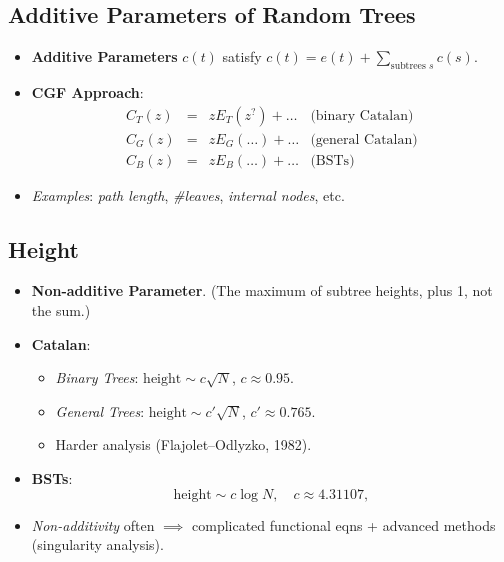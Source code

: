 \documentclass[11pt,letterpaper]{article}
\begin{document}
\subsection{Additive Parameters of Random Trees}
\begin{itemize}
  \item \textbf{Additive Parameters} $c(t)$ satisfy $c(t) = e(t) + \sum_{\text{subtrees }s}c(s)$.
  \item \textbf{CGF Approach}:
    \[
      \begin{aligned}
        C_T(z) &=& zE_T(z^?)+\dots & \text{(binary Catalan)}\\
        C_G(z) &=& zE_G(\dots)+\dots & \text{(general Catalan)}\\
        C_B(z) &=& zE_B(\dots)+\dots & \text{(BSTs)}
      \end{aligned}
    \]
  \item \emph{Examples}: \emph{path length}, \emph{\#leaves}, \emph{internal nodes}, etc.
\end{itemize}

\subsection{Height}
\begin{itemize}
  \item \textbf{Non-additive Parameter}. (The maximum of subtree heights, plus 1, not the sum.)
  \item \textbf{Catalan}:
    \begin{itemize}
      \item \textit{Binary Trees}: $\mathrm{height}\sim c\sqrt{N}$, $c\approx 0.95$. 
      \item \textit{General Trees}: $\mathrm{height}\sim c'\sqrt{N}$, $c'\approx 0.765$. 
      \item Harder analysis (Flajolet--Odlyzko, 1982).
    \end{itemize}
  \item \textbf{BSTs}:
    \[
      \mathrm{height}\sim c\log N, \quad c\approx 4.31107,
    \]
  \item \emph{Non-additivity} often $\implies$ complicated functional eqns + advanced methods (singularity analysis).
\end{itemize}

\end{document}
